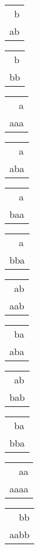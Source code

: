 \begin{tabular}{|l|} \hline
\ b \\
ab \\
\hline
\end{tabular} 
\begin{tabular}{|l|} \hline
\ b \\
bb \\
\hline
\end{tabular} 
\begin{tabular}{|l|} \hline
\ \ a \\
aaa \\
\hline
\end{tabular} 
\begin{tabular}{|l|} \hline
\ \ a \\
aba \\
\hline
\end{tabular} 
\begin{tabular}{|l|} \hline
\ \ a \\
baa \\
\hline
\end{tabular} 
\begin{tabular}{|l|} \hline
\ \ a \\
bba \\
\hline
\end{tabular} 
\begin{tabular}{|l|} \hline
\ ab \\
aab \\
\hline
\end{tabular} 
\begin{tabular}{|l|} \hline
\ ba \\
aba \\
\hline
\end{tabular} 
\begin{tabular}{|l|} \hline
\ ab \\
bab \\
\hline
\end{tabular} 
\begin{tabular}{|l|} \hline
\ ba \\
bba \\
\hline
\end{tabular} 
\begin{tabular}{|l|} \hline
\ \ aa \\
aaaa \\
\hline
\end{tabular} 
\begin{tabular}{|l|} \hline
\ \ bb \\
aabb \\
\hline
\end{tabular} 
